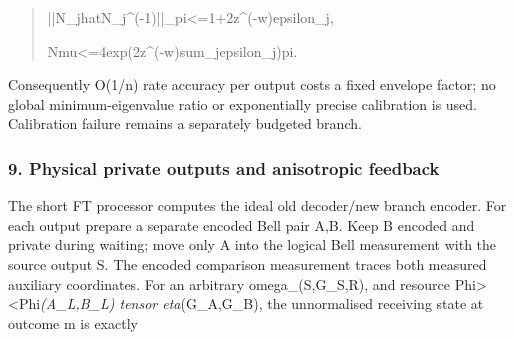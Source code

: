 \documentclass[
]{article}
\begin{document}
\begin{quote}\small\ttfamily\raggedright\setlength{\parskip}{0pt}
\noindent |\allowbreak{}|\allowbreak{}N\allowbreak{}\_\allowbreak{}j\allowbreak{}\hspace*{0.525em}\allowbreak{}h\allowbreak{}a\allowbreak{}t\allowbreak{}N\allowbreak{}\_\allowbreak{}j\allowbreak{}\^{}\allowbreak{}(\allowbreak{}-\allowbreak{}1\allowbreak{})\allowbreak{}|\allowbreak{}|\allowbreak{}\_\allowbreak{}p\allowbreak{}i\allowbreak{}<\allowbreak{}=\allowbreak{}1\allowbreak{}+\allowbreak{}2\allowbreak{}z\allowbreak{}\^{}\allowbreak{}(\allowbreak{}-\allowbreak{}w\allowbreak{})\allowbreak{}e\allowbreak{}p\allowbreak{}s\allowbreak{}i\allowbreak{}l\allowbreak{}o\allowbreak{}n\allowbreak{}\_\allowbreak{}j\allowbreak{},\par
\noindent N\allowbreak{}m\allowbreak{}u\allowbreak{}<\allowbreak{}=\allowbreak{}4\allowbreak{}\hspace*{0.525em}\allowbreak{}e\allowbreak{}x\allowbreak{}p\allowbreak{}(\allowbreak{}2\allowbreak{}z\allowbreak{}\^{}\allowbreak{}(\allowbreak{}-\allowbreak{}w\allowbreak{})\allowbreak{}s\allowbreak{}u\allowbreak{}m\allowbreak{}\_\allowbreak{}j\allowbreak{}\hspace*{0.525em}\allowbreak{}e\allowbreak{}p\allowbreak{}s\allowbreak{}i\allowbreak{}l\allowbreak{}o\allowbreak{}n\allowbreak{}\_\allowbreak{}j\allowbreak{})\allowbreak{}\hspace*{0.525em}\allowbreak{}p\allowbreak{}i\allowbreak{}.\par
\end{quote}

Consequently O(1/n) rate accuracy per output costs a fixed envelope
factor; no global minimum-eigenvalue ratio or exponentially precise
calibration is used. Calibration failure remains a separately budgeted
branch.

\subsubsection{9. Physical private outputs and anisotropic
feedback}\label{physical-private-outputs-and-anisotropic-feedback}

The short FT processor computes the ideal old decoder/new branch
encoder. For each output prepare a separate encoded Bell pair A,B. Keep
B encoded and private during waiting; move only A into the logical Bell
measurement with the source output S. The encoded comparison measurement
traces both measured auxiliary coordinates. For an arbitrary
o\allowbreak{}m\allowbreak{}e\allowbreak{}g\allowbreak{}a\allowbreak{}\_\allowbreak{}(\allowbreak{}S\allowbreak{},\allowbreak{}G\allowbreak{}\_\allowbreak{}S\allowbreak{},\allowbreak{}R\allowbreak{})\allowbreak{},
and resource
\textbar Phi\textgreater\textless Phi\textbar{}\emph{(A\_L,B\_L) tensor
eta}(G\_A,G\_B), the unnormalised receiving state at outcome m is
exactly
\end{document}

